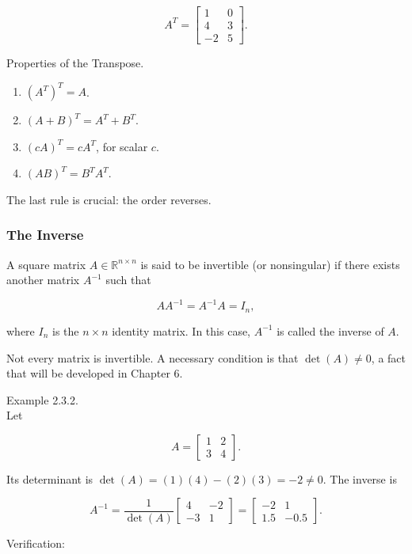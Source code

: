 \documentclass[
  12pt,
  a4paper,
]{article}
\begin{document}
\[A^T = \begin{bmatrix}
1 & 0 \\
4 & 3 \\
-2 & 5
\end{bmatrix}.\]

Properties of the Transpose.

\begin{enumerate}
\def\labelenumi{\arabic{enumi}.}
\item
  \( (A^T)^T = A\).
\item
  \( (A+B)^T = A^T + B^T\).
\item
  \( (cA)^T = cA^T\), for scalar \(c\).
\item
  \( (AB)^T = B^T A^T\).
\end{enumerate}

The last rule is crucial: the order reverses.

\subsubsection{The Inverse}\label{the-inverse}

A square matrix \(A \in \mathbb{R}^{n \times n}\) is said to be
invertible (or nonsingular) if there exists another matrix \(A^{-1}\)
such that

\[AA^{-1} = A^{-1}A = I_n,\]

where \(I_n\) is the \(n \times n\) identity matrix. In this case,
\(A^{-1}\) is called the inverse of \(A\).

Not every matrix is invertible. A necessary condition is that
\(\det(A) \neq 0\), a fact that will be developed in Chapter 6.

Example 2.3.2.\\
Let

\[A = \begin{bmatrix}
1 & 2 \\
3 & 4
\end{bmatrix}.\]

Its determinant is \(\det(A) = (1)(4) - (2)(3) = -2 \neq 0\). The
inverse is

\[A^{-1} = \frac{1}{\det(A)} \begin{bmatrix}
4 & -2 \\
-3 & 1
\end{bmatrix}
=
\begin{bmatrix}
-2 & 1 \\
1.5 & -0.5
\end{bmatrix}.\]

Verification:
\end{document}
